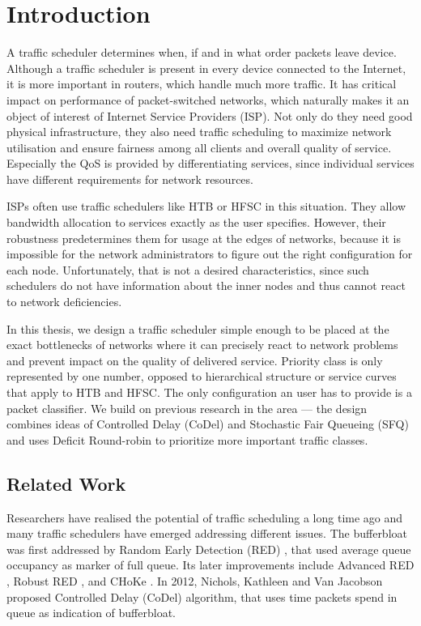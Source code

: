 \chapter*{Introduction}

A traffic scheduler determines when, if and in what order packets leave device. Although a traffic scheduler is present in every device connected to the Internet, it is more important in routers, which handle much more traffic. It has critical impact on performance of packet-switched networks, which naturally makes it an object of interest of Internet Service Providers (ISP).  Not only do they need good physical infrastructure, they also need traffic scheduling to maximize network utilisation and ensure fairness among all clients and overall quality of service. Especially the QoS is provided by differentiating services, since individual services have different requirements for network resources.

ISPs often use traffic schedulers like HTB or HFSC in this situation. They allow  bandwidth allocation to services exactly as the user specifies. However, their robustness predetermines them for usage at the edges of networks, because it is impossible for the network administrators to figure out the right configuration for each node. Unfortunately, that is not a desired characteristics, since such schedulers do not have information about the inner nodes and thus cannot react to network deficiencies.

In this thesis, we design a traffic scheduler simple enough to be placed at the exact bottlenecks of networks where it can precisely react to network problems and prevent impact on the quality of delivered service. Priority class is only represented by one number, opposed to hierarchical structure or service curves that apply to HTB and HFSC. The only configuration an user has to provide is a packet classifier. We build on previous research in the area --- the design combines ideas of Controlled Delay (CoDel) and Stochastic Fair Queueing (SFQ) and uses Deficit Round-robin to prioritize more important traffic classes. 


\section*{Related Work}
Researchers have realised the potential of traffic scheduling a long time ago and many traffic schedulers have emerged addressing different issues. The bufferbloat was first addressed by Random Early Detection (RED) \cite{Floyd:1993:RED:169931.169935}, that used average queue occupancy as marker of full queue. Its later improvements include Advanced RED \cite{Floyd01adaptivered:}, Robust RED \cite{RRED}, and CHoKe \cite{pan2000choke}. In 2012, Nichols, Kathleen and Van Jacobson proposed Controlled Delay (CoDel) algorithm, that uses time packets spend in queue as indication of bufferbloat.

